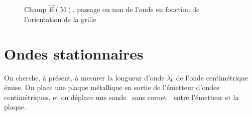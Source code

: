 \documentclass[a4paper,twocolumn,10pt,margin=0.5in]{extreport}
\begin{document}
	\begin{figure}[H]
		\centering
		\vspace{-1cm}
		\vspace{-1cm}
		\vspace{1cm}
		\caption{Champ $\vec{E}(\mathrm{M})$, passage ou non de l'onde en fonction de l'orientation de la grille}
		\label{fig:montage-polarisation-champs}
	\end{figure}

	\bigskip

	\section{Ondes stationnaires}

	On cherche, à présent, à mesurer la longueur d'onde $\lambda_0$ de l'onde centimétrique émise.
	On place une plaque métallique en sortie de l'émetteur d'ondes centimétriques, et on déplace une sonde \guillemotleft~sans cornet~\guillemotright\ entre l'émetteur et la plaque.
\end{document}
